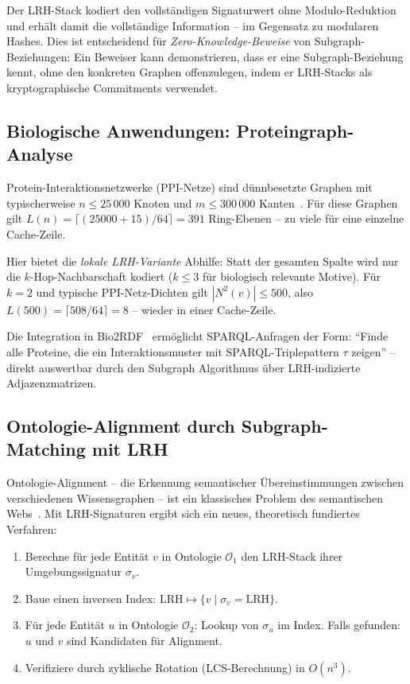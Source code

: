 ﻿\documentclass[a4paper,12pt]{article}
\theoremstyle{definition}
\begin{document}
Der LRH-Stack kodiert den vollständigen Signaturwert ohne Modulo-Reduktion und
erhält damit die vollständige Information -- im Gegensatz zu modularen Hashes.
Dies ist entscheidend für \emph{Zero-Knowledge-Beweise} von Subgraph-Beziehungen:
Ein Beweiser kann demonstrieren, dass er eine Subgraph-Beziehung kennt, ohne den
konkreten Graphen offenzulegen, indem er LRH-Stacks als kryptographische Commitments
verwendet.

\subsection{Biologische Anwendungen: Proteingraph-Analyse}

Protein-Interaktionsnetzwerke (PPI-Netze) sind dünnbesetzte Graphen mit typischerweise
$n \leq 25\,000$ Knoten und $m \leq 300\,000$ Kanten~\cite{sharan2006}. Für diese
Graphen gilt $L(n) = \lceil (25000 + 15) / 64 \rceil = 391$ Ring-Ebenen -- zu viele
für eine einzelne Cache-Zeile.

Hier bietet die \emph{lokale LRH-Variante} Abhilfe: Statt der gesamten Spalte
wird nur die $k$-Hop-Nachbarschaft kodiert ($k \leq 3$ für biologisch relevante
Motive). Für $k=2$ und typische PPI-Netz-Dichten gilt $|N^2(v)| \leq 500$, also
$L(500) = \lceil 508/64 \rceil = 8$ -- wieder in einer Cache-Zeile.

Die Integration in Bio2RDF~\cite{belleau2008} ermöglicht SPARQL-Anfragen der Form:
``Finde alle Proteine, die ein Interaktionsmuster mit SPARQL-Triplepattern $\tau$
zeigen'' -- direkt auswertbar durch den Subgraph Algorithmus über LRH-indizierte
Adjazenzmatrizen.

\subsection{Ontologie-Alignment durch Subgraph-Matching mit LRH}

Ontologie-Alignment -- die Erkennung semantischer Übereinstimmungen zwischen
verschiedenen Wissensgraphen -- ist ein klassisches Problem des semantischen
Webs~\cite{euzenat2007}. Mit LRH-Signaturen ergibt sich ein neues, theoretisch
fundiertes Verfahren:

\begin{enumerate}
  \item Berechne für jede Entität $v$ in Ontologie $\mathcal{O}_1$ den
        LRH-Stack ihrer Umgebungssignatur $\sigma_v$.
  \item Baue einen inversen Index: $\mathrm{LRH} \mapsto \{v \mid \sigma_v = \mathrm{LRH}\}$.
  \item Für jede Entität $u$ in Ontologie $\mathcal{O}_2$: Lookup von $\sigma_u$ im Index.
        Falls gefunden: $u$ und $v$ sind Kandidaten für Alignment.
  \item Verifiziere durch zyklische Rotation (LCS-Berechnung) in $O(n^3)$.
\end{enumerate}
\end{document}
